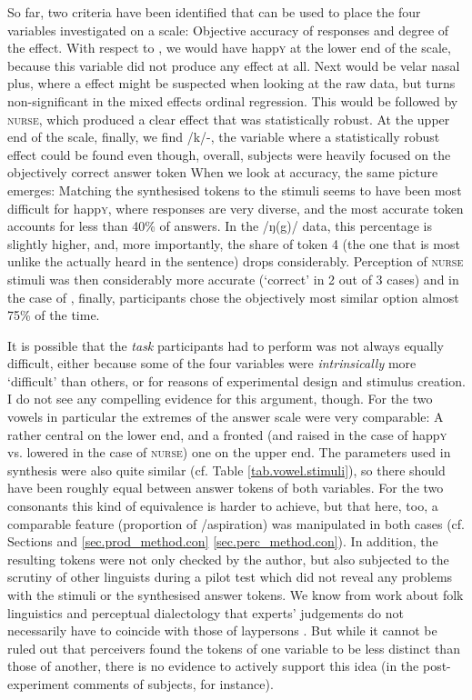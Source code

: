 So far, two criteria have been identified that can be used to place the four variables investigated on a scale: Objective accuracy of responses and degree of the  effect.
With respect to , we would have happ\textsc{y} at the lower end of the scale, because this variable did not produce any  effect at all.
Next would be velar nasal plus, where a  effect might be suspected when looking at the raw data, but turns non-significant in the mixed effects ordinal regression.
This would be followed by \textsc{nurse}, which produced a clear  effect that was statistically robust.
At the upper end of the scale, finally, we find /k/-, the variable where a statistically robust  effect could be found even though, overall, subjects were heavily focused on the objectively correct answer token
When we look at accuracy, the same picture emerges:
Matching the synthesised tokens to the stimuli seems to have been most difficult for happ\textsc{y}, where responses are very diverse, and the most accurate token accounts for less than 40\% of answers.
In the /ŋ(g)/ data, this percentage is slightly higher, and, more importantly, the share of token 4 (the one that is most unlike the  actually heard in the sentence) drops considerably.
Perception of \textsc{nurse} stimuli was then considerably more accurate (`correct'  in 2 out of 3 cases) and in the case of , finally, participants chose the objectively most similar option almost 75\% of the time.

It is possible that the \emph{task} participants had to perform was not always equally difficult, either because some of the four variables were \emph{intrinsically} more `difficult' than others, or for reasons of experimental design and stimulus creation.
I do not see any compelling evidence for this argument, though.
For the two vowels in particular the extremes of the answer scale were very comparable: A rather central  on the lower end, and a fronted (and raised in the case of happ\textsc{y} vs. lowered in the case of \textsc{nurse)} one on the upper end.
The parameters used in synthesis were also quite similar (cf. Table \ref{tab.vowel.stimuli}), so there should have been roughly equal  between answer tokens of both variables.
For the two consonants this kind of equivalence is harder to achieve, but  that here, too, a comparable feature (proportion of /aspiration) was manipulated in both cases (cf. Sections and \ref{sec.prod_method.con} \ref{sec.perc_method.con}).
In addition, the resulting tokens were not only checked  by the author, but also subjected to the scrutiny of other linguists during a pilot test which did not reveal any problems with the stimuli or the synthesised answer tokens.
We know from work about folk linguistics and perceptual dialectology that experts' judgements do not necessarily have to coincide with those of laypersons \parencite{preston1999,niedzielskipreston2000}.
But while it cannot be ruled out that perceivers found the tokens of one variable to be less distinct than those of another, there is no evidence to actively support this idea (in the post-experiment comments of subjects, for instance). 

